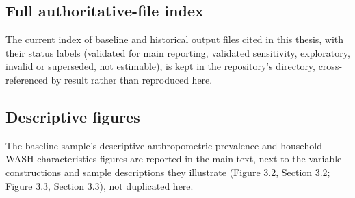 \subsection{Full authoritative-file index}\label{sec:A.5}

The current index of baseline and historical output files cited in this thesis, with their status labels (validated for main reporting, validated sensitivity, exploratory, invalid or superseded, not estimable), is kept in the repository's  directory, cross-referenced by result rather than reproduced here.

\subsection{Descriptive figures}\label{sec:A.6}

The baseline sample's descriptive anthropometric-prevalence and household-WASH-characteristics figures are reported in the main text, next to the variable constructions and sample descriptions they illustrate (Figure 3.2, Section 3.2; Figure 3.3, Section 3.3), not duplicated here.
